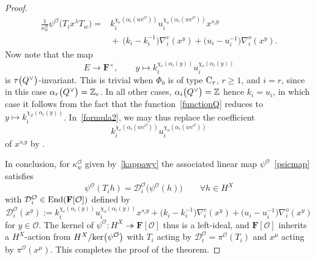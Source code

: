 \documentclass[pdftex]{sigma}
\numberwithin{equation}{section}
\begin{document}
\begin{proof}
\begin{align}
\frac{1}{\kappa_w^\mathcal{O}}\psi^\mathcal{O}\bigl(T_ix^\lambda T_w\bigr)
={}&k_i^{\chi_e(\alpha_i (wc^\mathcal{O} ))}u_i^{\chi_o(\alpha_i (wc^\mathcal{O} ))}x^{s_iy}\nonumber\\
&{}{+}\ \bigl(k_i-k_i^{-1}\bigr)\nabla_i^e(x^y)+\bigl(u_i-u_i^{-1}\bigr)\nabla_i^o(x^y).\label{formula2}
\end{align}
Now note that the map
\begin{equation}\label{functionQ}
E\rightarrow\mathbf{F}^\times,\qquad y\mapsto k_i^{\chi_e(\alpha_i(y))}u_i^{\chi_o(\alpha_i(y))}
\end{equation}
is $\tau\smash{\bigl(Q^\vee\bigr)}$-invariant. This is trivial when $\Phi_0$ is of type ${\rm C}_r$, $r\geq 1$, and $i=r$, since in this case $\alpha_r\smash{\bigl(Q^\vee\bigr)}=\mathbb{Z}_e$. In all other cases, $\alpha_i\smash{\bigl(Q^\vee\bigr)}=\mathbb{Z}$ hence $k_i=u_i$, in which case it follows from the fact that the function~\eqref{functionQ} reduces to $y\mapsto k_i^{\chi_{\mathbb{Z}}(\alpha_i(y))}$.
In~\eqref{formula2}, we may thus replace the coefficient
\[
k_i^{\chi_e(\alpha_i (wc^\mathcal{O} ))}u_i^{\chi_o(\alpha_i (wc^\mathcal{O} ))}
\] of $x^{s_iy}$ by
.

In conclusion, for $\kappa_w^\mathcal{O}$ given by~\eqref{kappawy} the associated linear map $\psi^\mathcal{O}$~\eqref{psicmap} satisfies
\[
\psi^\mathcal{O}(T_ih)=\mathcal{D}_i^\mathcal{O}\bigl(\psi^\mathcal{O}(h)\bigr)\qquad \forall h\in H^X
\]
with $\mathcal{D}_i^\mathcal{O}\in\textup{End}(\mathbf{F}[\mathcal{O}])$ defined by
\begin{equation*}
\mathcal{D}_i^\mathcal{O}(x^y):=k_i^{\chi_e(\alpha_i(y))}u_i^{\chi_o(\alpha_i(y))}x^{s_iy}+\bigl(k_i-k_i^{-1}\bigr)\nabla_i^e(x^y)+\bigl(u_i-u_i^{-1}\bigr)\nabla_i^o(x^y)
\end{equation*}
for $y\in\mathcal{O}$.
The kernel of $\psi^\mathcal{O}\colon H^X\twoheadrightarrow\mathbf{F}[\mathcal{O}]$ thus is a left-ideal, and $\mathbf{F}[\mathcal{O}]$ inherits a $H^X$-action from $H^X/\textup{ker}\bigl(\psi^\mathcal{O}\bigr)$ with $T_i$ acting by $\mathcal{D}_i^\mathcal{O}=\pi^\mathcal{O}(T_i)$ and $x^\mu$ acting by
$\pi^\mathcal{O}(x^\mu)$. This completes the proof of the theorem.
\end{proof}
\end{document}
